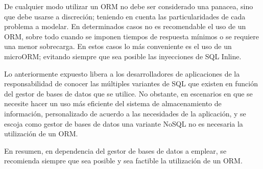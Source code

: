 \documentclass[preprint,12pt]{elsarticle}
\begin{document}
De cualquier modo utilizar un ORM no debe ser considerado una panacea, sino que debe usarse a discreción; teniendo en cuenta las particularidades de cada problema a modelar. En determinados casos no es recomendable el uso de un ORM, sobre todo cuando se imponen tiempos de respuesta mínimos o se requiere una menor sobrecarga. En estos casos lo más conveniente es el uso de un microORM;
evitando siempre que sea posible las inyecciones de SQL Inline.

Lo anteriormente expuesto libera a los desarrolladores de aplicaciones de la responsabilidad de conocer las múltiples variantes de SQL que existen en función del gestor de bases de datos que se utilice. No obstante, en escenarios en que se necesite hacer un uso más eficiente del sistema de almacenamiento de información, personalizado de acuerdo a las necesidades de la aplicación, y se escoja como gestor de bases de datos una variante NoSQL no es necesaria la utilización de un ORM.

En resumen, en dependencia del gestor de bases de datos a emplear, se recomienda siempre que sea posible y sea factible la utilización de un ORM.	


	
	

	
	\newpage
	
		 

    

	
\end{document}
